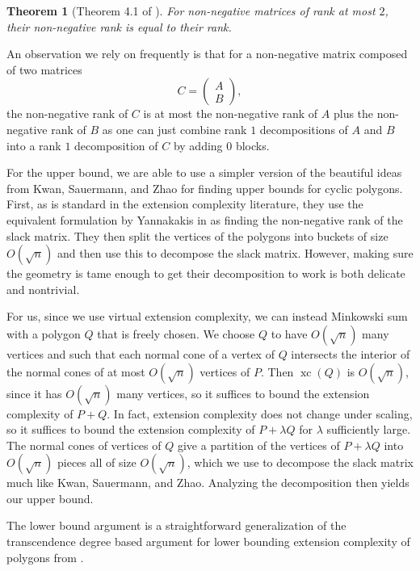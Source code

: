 \documentclass[centering,11pt,reqno]{amsart}
\newtheorem{theorem}{Theorem}[section]
\theoremstyle{definition}
\DeclareMathOperator{\xc}{xc}
\begin{document}
\begin{theorem}[Theorem 4.1 of \cite{NonnegRank2}]
\label{thm:LowRank}
For non-negative matrices of rank at most $2$, their non-negative rank is equal to their rank.
\end{theorem}

An observation we rely on frequently is that for a non-negative matrix composed of two matrices
\[C=\begin{pmatrix} A \\ B\end{pmatrix},\]
the non-negative rank of $C$ is at most the non-negative rank of $A$ plus the non-negative rank of $B$ as one can just combine rank $1$ decompositions of $A$ and $B$ into a rank $1$ decomposition of $C$ by adding $0$ blocks.


For the upper bound, we are able to use a simpler version of the beautiful ideas from Kwan, Sauermann, and Zhao \cite{LowDimExtensions} for finding upper bounds for cyclic polygons. First, as is standard in the extension complexity literature, they use the equivalent formulation by Yannakakis in \cite{YannakakisLemma} as finding the non-negative rank of the slack matrix. They then split the vertices of the polygons into buckets of size $O(\sqrt{n})$ and then use this to decompose the slack matrix. However, making sure the geometry is tame enough to get their decomposition to work is both delicate and nontrivial. 

For us, since we use virtual extension complexity, we can instead Minkowski sum with a polygon $Q$ that is freely chosen. We choose $Q$ to have $O(\sqrt{n})$ many vertices and such that each normal cone of a vertex of $Q$ intersects the interior of the normal cones of at most $O(\sqrt{n})$ vertices of $P$. Then $\xc(Q)$ is $O(\sqrt{n})$, since it has $O(\sqrt{n})$ many vertices, so it suffices to bound the extension complexity of $P+Q$. In fact, extension complexity does not change under scaling, so it suffices to bound the extension complexity of $P+\lambda Q$ for $\lambda$ sufficiently large. The normal cones of vertices of $Q$ give a partition of the vertices of $P+\lambda Q$ into $O(\sqrt{n})$ pieces all of size $O(\sqrt{n})$, which we use to decompose the slack matrix much like Kwan, Sauermann, and Zhao. Analyzing the decomposition then yields our upper bound. 

The lower bound argument is a straightforward generalization of the transcendence degree based argument for lower bounding extension complexity of polygons from \cite{PolygonExtensions}.
\end{document}
